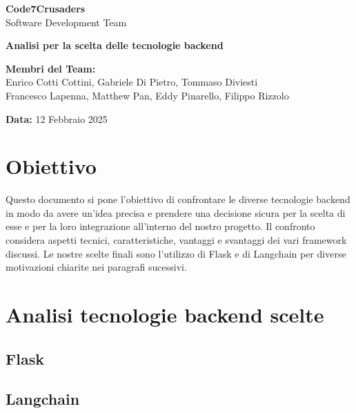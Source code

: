 \documentclass{article}
\begin{document}
\begin{titlepage}
    {\Huge \textbf{Code7Crusaders}}\\
    \vspace{0.5cm}
    {\Large Software Development Team}\\
    \vspace{2cm}
    
    {\large \textbf{Analisi per la scelta delle tecnologie backend}}\\
    \vspace{5cm}

    \textbf{Membri del Team:}\\
    Enrico Cotti Cottini, Gabriele Di Pietro, Tommaso Diviesti \\
    Francesco Lapenna, Matthew Pan, Eddy Pinarello, Filippo Rizzolo \\
    \vspace{0.5cm}
    
    {\large \textbf{Data:}} 12 Febbraio 2025\\
    
    \vspace{1cm}
\end{titlepage}
\clearpage

\newpage
\tableofcontents
\newpage

\section{Obiettivo}
Questo documento si pone l'obiettivo di confrontare le diverse 
tecnologie backend in modo da avere un'idea precisa e prendere 
una decisione sicura per la scelta di esse e per la loro integrazione 
all'interno del nostro progetto. Il confronto considera aspetti 
tecnici, caratteristiche, vantaggi e svantaggi dei vari framework 
discussi. Le nostre scelte finali sono l'utilizzo di Flask e di 
Langchain per diverse motivazioni chiarite nei paragrafi sucessivi.

\section{Analisi tecnologie backend scelte}

\subsection{Flask}

\subsection{Langchain}
\end{document}
